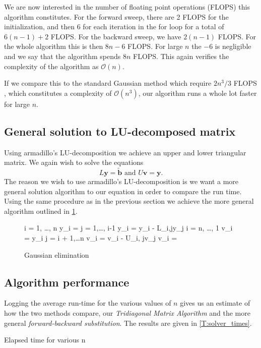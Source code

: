 \documentclass[10pt,a4paper]{amsart}
\begin{document}
  We are now interested in the number of floating point operations (FLOPS) this
  algorithm constitutes. For the forward sweep, there are 2 FLOPS for the
  initialization, and then 6 for each iteration in the for loop for a total of
  $6(n-1) + 2$ FLOPS. For the backward sweep, we have $2(n-1)$ FLOPS.  For the
  whole algorithm this is then $8n - 6$ FLOPS. For large $n$ the $-6$ is
  negligible and we say that the algorithm spends $8n$ FLOPS. This again
  verifies the complexity of the algorithm as $\mathcal O(n)$.

  If we compare this to the standard Gaussian method which require $2n^3/3$
  FLOPS \cite{gauss}, which constitutes a complexity of $\mathcal O(n^3)$, our algorithm
  runs a whole lot faster for large $n$. 

  \clearpage
  \subsection{General solution to LU-decomposed matrix}
  \label{sub:standard_gaussian_elimination}
  
  Using armadillo's LU-decomposition we achieve an upper and lower triangular matrix. We again wish to solve the equations
  \begin{equation}
    L\mathbf{y} = \tilde{\mathbf{b}} \text{ and } U\mathbf{v} = \mathbf{y}.
  \end{equation}
  The reason we wish to use armadillo's LU-decomposition is we want a more general solution algorithm to our equation in order to compare the run time.
  Using the same procedure as in the previous section we achieve the more general algorithm outlined in
  \cref{f:gauss}.
  \begin{figure}[h]
  \caption{Gaussian elimination}
  \label{f:gauss}
  \centering
  \begin{program}
    \FOR i = 1, \ldots, n \DO
      y_i = 
      \FOR j = 1,\ldots, i-1 \DO
        y_i = y_i - L_{i,j}y_j
        \OD
      \OD
    \FOR i = n, \ldots, 1 \DO
      v_i = y_i
      \FOR j = i + 1,\ldots n \DO
        v_i = v_i - U_{i, j}v_j
        \OD
        v_i = 
        \OD
  \end{program}
\end{figure}
\subsection{Algorithm performance}
\label{sub:algorithm_performance}
Logging the average run-time for the various values of $n$ gives us an estimate of how the two methods compare, our \emph{Tridiagonal Matrix Algorithm} and the more general
\emph{forward-backward substitution}. The results are given in \cref{T:solver_times}.
\begin{table}[h]
\caption{Elapsed time for various n}

\label{T:solver_times}
\end{table}
\end{document}
